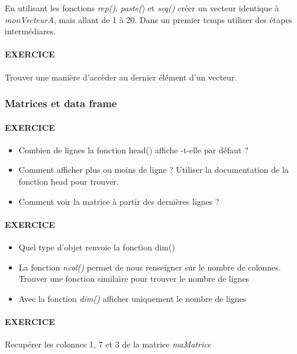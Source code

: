 En utilisant les fonctions \emph{rep()}, \emph{paste(}) et \emph{seq()} créer un vecteur identique à \emph{monVecteurA}, mais allant de 1 à 20. Dans un premier temps utiliser des étapes intermédiares.

\vspace{1em}


\paragraph{EXERCICE} \par

Trouver une manière d'accèder au dernier élément d'un vecteur.

\vspace{1em}


\subsubsection{Matrices et data frame}


 \vspace{1em}
\paragraph{EXERCICE} 
\begin{itemize}
\item Combien de lignes la fonction head() affiche -t-elle par défaut ?
\item Comment afficher plus ou moins de ligne ? Utiliser la documentation de la fonction head pour trouver.
\item Comment voir la matrice à partir des dernières lignes ?
\end{itemize}

 \vspace{1em}
\paragraph{EXERCICE} 
\begin{itemize}
\item Quel type d'objet renvoie la fonction dim()
\item La fonction \emph{ncol()} permet de nous renseigner sur le nombre de colonnes.
Trouver une fonction similaire pour trouver le nombre de lignes
\item Avec la fonction \emph{dim()} afficher uniquement le nombre de lignes
\end{itemize}

 \vspace{1em}
\paragraph{EXERCICE} \par

Recupérer les colonnes 1, 7 et 3 de la matrice \emph{maMatrice}

